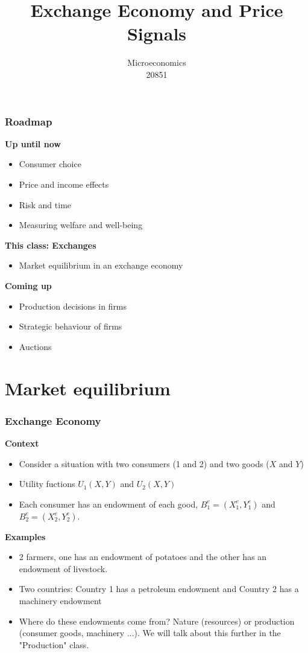 \documentclass[handout]{beamer}
\title{Exchange Economy and Price Signals}
\author{Microeconomics \\ 20851}
\date{}
\newenvironment{iPar}[1]{\textbf{#1} \begin{itemize}}{\end{itemize}}
\newcommand{\mdp}{\medskip \pause}
\begin{document}
\frame{\titlepage}

\section[Outline]{}
\frame{\tableofcontents}

\section{}


\begin{frame}\frametitle{Roadmap}

\begin{iPar}{Up until now}
\item Consumer choice
\item Price and income effects
\item Risk and time
\item Measuring welfare and well-being
\end{iPar}\mdp

\begin{iPar}{This class: Exchanges}
\item Market equilibrium in an exchange economy
\end{iPar}\mdp

\begin{iPar}{Coming up}
\item  Production decisions in firms
\item Strategic behaviour of firms
\item Auctions
\end{iPar}


\end{frame}

\section{Market equilibrium}

\begin{frame}\frametitle{Exchange Economy}

\begin{iPar}{Context} \item Consider a situation with two consumers (1 and 2) and two goods ($X$ and $Y$) \item Utility fuctions $U_1(X,Y)$ and
$U_2(X,Y)$ \item Each consumer has an endowment of each good, $B_1^e = (X_1^e,Y_1^e)$ and $B_2^e = (X_2^e,Y_2^e)$. \end{iPar}
\mdp


\begin{iPar}{Examples} \item 2 farmers, one has an endowment of potatoes and the other has an endowment of livestock. \item  Two countries: Country 1 has a petroleum endowment and Country 2 has a machinery endowment \item Where do these endowments come from? Nature (resources) or production
(consumer goods, machinery ...). We will talk about this further in the "Production" class. 
\end{iPar}

\end{frame}
\end{document}
